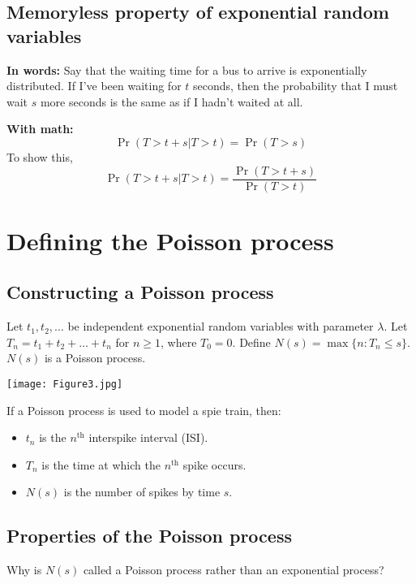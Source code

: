 \documentclass[11pt]{article}
\begin{document}
\subsection{Memoryless property of exponential random variables}

{\bf In words:} Say that the waiting time for a bus to arrive is exponentially distributed. If I've been waiting
for $t$ seconds, then the probability that I must wait $s$ more seconds is the same as if I hadn't waited
at all.

{\bf With math:}
\begin{equation}
\Pr\left(T > t + s \vert T > t\right) = \Pr\left(T > s\right)
\end{equation}
To show this,
\begin{equation}
\Pr\left(T > t + s \vert T > t\right) = \frac{\Pr\left(T > t + s\right)}{\Pr\left(T > t\right)}
\end{equation}

\section{Defining the Poisson process}
\subsection{Constructing a Poisson process}
Let $t_1, t_2, \ldots$ be independent exponential random variables with parameter $\lambda$. Let
$T_n = t_1 + t_2 + \ldots + t_n$ for $n \geq 1$, where $T_0 = 0$. Define $N(s) = \max \lbrace n : T_n \leq s\rbrace$. $N(s)$ is a Poisson process.

\begin{center}
\texttt{[image: Figure3.jpg]}
\end{center}

If a Poisson process is used to model a spie train, then:
\begin{itemize}
\item $t_n$ is the $n^{\text{th}}$ interspike interval (ISI).
\item $T_n$ is the time at which the $n^{\text{th}}$ spike occurs.
\item $N(s)$ is the number of spikes by time $s$.
\end{itemize}


\subsection{Properties of the Poisson process}
Why is $N(s)$ called a Poisson process rather than an exponential process?
\end{document}

